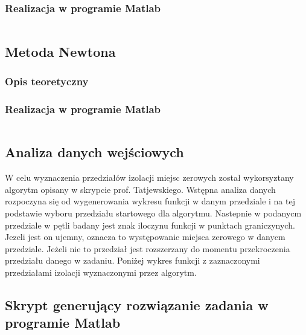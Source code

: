 \documentclass[a4paper, 11pt]{article}
\begin{document}
\subsubsection{Realizacja w programie Matlab}
\begin{lstlisting}

\end{lstlisting}

\subsection{Metoda Newtona}
\subsubsection{Opis teoretyczny}


\subsubsection{Realizacja w programie Matlab}
\begin{lstlisting}

\end{lstlisting}

\subsection{Analiza danych wejściowych}
W celu wyznaczenia przedziałów izolacji miejsc zerowych został wykorsyztany algorytm opisany w skrypcie prof. Tatjewskiego. Wstępna analiza danych rozpoczyna się od wygenerowania wykresu funkcji w danym przedziale i na tej podstawie wyboru przedziału startowego dla algorytmu. Nastepnie w podanycm przedziale w pętli badany jest znak iloczynu funkcji w punktach graniczynych. Jezeli jest on ujemny, oznacza to występowanie miejsca zerowego w danycm przedziale. Jeżeli nie to przedział jest rozszerzany do momentu przekroczenia przedziału danego w zadaniu. 
Poniżej wykres funkcji z zaznaczonymi przedziałami izolacji wyznaczonymi przez algorytm. 


\subsection{Skrypt generujący rozwiązanie zadania w programie Matlab}
\begin{lstlisting}

\end{lstlisting}
\vspace{1cm}
\end{document}
